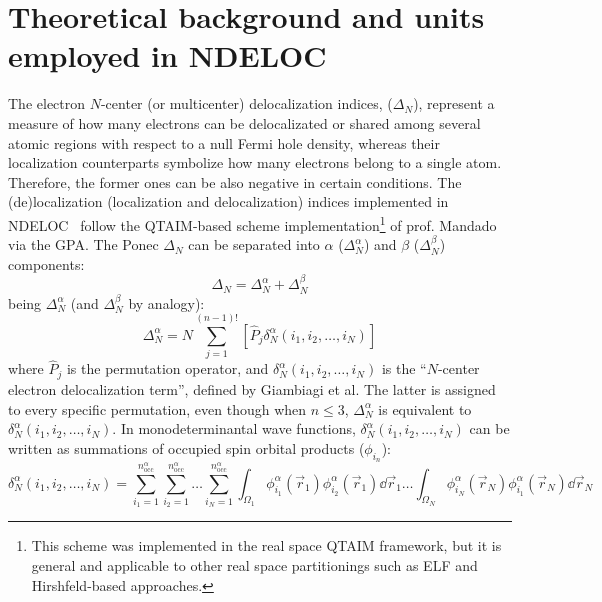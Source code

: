 \documentclass[a4paper,11pt,openany]{memoir}
\newcommand\programa{\textsc{NDELOC}}
\begin{document}
\chapter[Theor. background and units]{Theoretical background and units employed in \programa}\label{chap:teo}
The electron $N$-center (or multicenter) delocalization indices, ($\varDelta_N$), represent a measure of how many electrons can be delocalizated or shared among several atomic regions with respect to a null Fermi hole density, whereas their localization counterparts symbolize how many electrons belong to a single atom. Therefore, the former ones can be also negative in certain conditions. The (de)localization (localization and delocalization) indices implemented in \programa~ follow the \acs{QTAIM}-based scheme implementation\footnote{This scheme was implemented in the real space \ac{QTAIM} framework, but it is general and applicable to other real space partitionings such as \ac{ELF} and Hirshfeld-based approaches.} of prof. Mandado\autocite{QTAIMncenterdelocalizationMGM2007,ChemicalgraphtheoryMGM2007} via the \ac{GPA}\autocite{MulticenterbondindicesBPD2005}. The Ponec $\varDelta_N$ can be separated into $\alpha$ ($\varDelta^{\alpha}_N$) and $\beta$ ($\varDelta^{\beta}_N$) components:
\begin{equation}
	\varDelta_N = \varDelta^{\alpha}_N + \varDelta^{\beta}_N
\end{equation}
being $\varDelta^{\alpha}_N$ (and $\varDelta^{\beta}_N$ by analogy):
\begin{equation}
	\varDelta^{\alpha}_N = N \sum_{j=1}^{(n-1)!}\left[\hat{P}_j\delta_N^{\alpha}(i_1,i_2,\ldots,i_N)\right]
\end{equation}
where $\hat{P}_j$ is the permutation operator, and $\delta_N^{\alpha}(i_1,i_2,\ldots,i_N)$ is the ``$N$-center electron delocalization term'', defined by Giambiagi et al\autocite{DefinitionmulticenterbondGGM1990,GraphicallinkingMOBGG2000,GraphicalLinkingMOBGG2001}. The latter is assigned to every specific permutation, even though when $n\le3$, $\varDelta^{\alpha}_N$ is
equivalent to $\delta_N^{\alpha}(i_1,i_2,\ldots,i_N)$. In monodeterminantal wave functions, $\delta_N^{\alpha}(i_1,i_2,\ldots,i_N)$ can be written as summations of occupied spin orbital products ($\phi_{i_n}$):
\begin{equation}
	\delta_N^{\alpha}(i_1,i_2,\ldots,i_N) = \sum_{i_1=1}^{n_{\text{occ}}^{\alpha}}\sum_{i_2=1}^{n_{\text{occ}}^{\alpha}}\ldots\sum_{i_N=1}^{n_{\text{occ}}^{\alpha}}
	\int_{\Omega_1}
		\phi_{i_1}^{\alpha}(\vec{r}_1)\phi_{i_2}^{\alpha}(\vec{r}_1)\dd{\vec{r}_1}
	\ldots
	\int_{\Omega_N}
		\phi_{i_N}^{\alpha}(\vec{r}_N)\phi_{i_1}^{\alpha}(\vec{r}_N)\dd{\vec{r}_N}
\end{equation}
\end{document}
